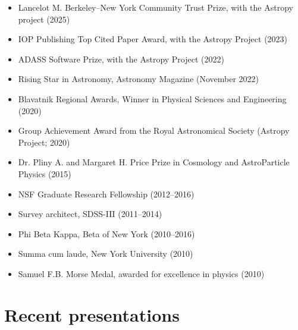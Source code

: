 \documentclass[12pt, letterpaper]{apw-cv}
\begin{document}
    \begin{itemize}
    \item Lancelot M. Berkeley--New York Community Trust Prize, with the Astropy project (2025)
    \item IOP Publishing Top Cited Paper Award, with the Astropy Project (2023)
    \item ADASS Software Prize, with the Astropy Project (2022)
    \item Rising Star in Astronomy, Astronomy Magazine (November 2022)
    \item Blavatnik Regional Awards, Winner in Physical Sciences and Engineering (2020)
    \item Group Achievement Award from the Royal Astronomical Society (Astropy Project; 2020)
    \item Dr. Pliny A. and Margaret H. Price Prize in Cosmology and AstroParticle Physics (2015)
	\item NSF Graduate Research Fellowship (2012--2016)
	\item Survey architect, SDSS-III (2011--2014)
	\item Phi Beta Kappa, Beta of New York (2010--2016)
	\item Summa cum laude, New York University (2010)
	\item Samuel F.B. Morse Medal, awarded for excellence in physics (2010)
	\end{itemize}

\section*{Recent presentations}
\end{document}
